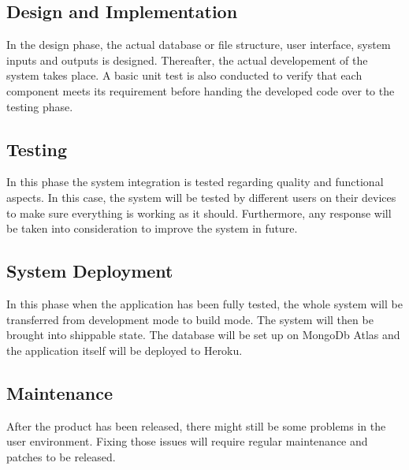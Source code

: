 \documentclass[twoside, a4paper, 12pt]{report}
\begin{document}
\subsection{Design and Implementation}
In the design phase, the actual database or file structure, user interface, system inputs and outputs is designed. Thereafter, the actual developement of the system takes place. A basic unit test is also conducted to verify that each component meets its requirement before handing the developed code over to the testing phase.

\subsection{Testing}
In this phase the system integration is tested regarding quality and functional aspects. In this case, the system will be tested by different users on their devices to make sure everything is working as it should. Furthermore, any response will be taken into consideration to improve the system in future.

\subsection{System Deployment}
In this phase when the application has been fully tested, the whole system will be transferred from development mode to build mode. The system will then be brought into shippable state. The database will be set up on MongoDb Atlas and the application itself will be deployed to Heroku.

\subsection{Maintenance}
After the product has been released, there might still be some problems in the user environment. Fixing those issues will require regular maintenance and patches to be released.

\printbibliography
\end{document}

